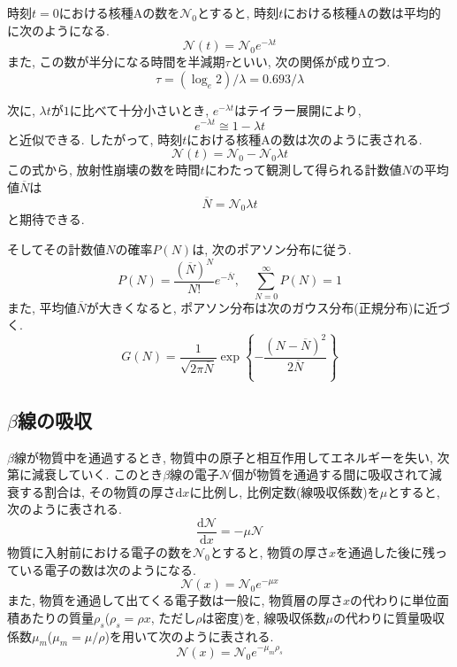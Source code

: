 \documentclass{jarticle}
\begin{document}
時刻$t=0$における核種$\mathrm{A}$の数を$\mathcal{N}_0$とすると, 時刻$t$における核種$\mathrm{A}$の数は平均的に次のようになる.
\begin{equation}
  \mathcal{N}(t) = \mathcal{N}_0 e^{-\lambda t}
\end{equation}
また, この数が半分になる時間を半減期$\tau$といい, 次の関係が成り立つ.
\begin{equation}
  \tau = (\log_e 2)/\lambda
  = 0.693/\lambda
\end{equation}

次に, $\lambda t$が$1$に比べて十分小さいとき, $e^{-\lambda t}$はテイラー展開により,
\begin{equation}
  e^{-\lambda t} \cong 1 - \lambda t
\end{equation}
と近似できる.
したがって, 時刻$t$における核種$\mathrm{A}$の数は次のように表される.
\begin{equation}
  \mathcal{N}(t)=\mathcal{N}_0-\mathcal{N}_0\lambda t
\end{equation}
この式から, 放射性崩壊の数を時間$t$にわたって観測して得られる計数値$N$の平均値$\overline{N}$は
\begin{equation}
  \overline{N} = \mathcal{N}_0\lambda t
\end{equation}
と期待できる.

そしてその計数値$N$の確率$P(N)$は, 次のポアソン分布に従う.
\begin{equation}
  P(N) = \frac{(\overline{N})^N}{N!}e^{-\overline{N}}, \quad
  \sum_{N=0}^{\infty} P(N) = 1
  \label{eq:poisson}
\end{equation}
また, 平均値$\overline{N}$が大きくなると, ポアソン分布は次のガウス分布(正規分布)に近づく.
\begin{equation}
  G(N) = \frac{1}{\sqrt{2\pi\overline{N}}} \exp \left\{-\frac{(N-\overline{N})^2}{2\overline{N}}\right\}
\end{equation}


\subsection{$\beta$線の吸収}

$\beta$線が物質中を通過するとき, 物質中の原子と相互作用してエネルギーを失い, 次第に減衰していく.
このとき$\beta$線の電子$\mathcal{N}$個が物質を通過する間に吸収されて減衰する割合は, その物質の厚さ$\mathrm{d}x$に比例し, 比例定数(線吸収係数)を$\mu$とすると, 次のように表される.
\begin{equation}
  \frac{\mathrm{d}\mathcal{N}}{\mathrm{d}x} = -\mu \mathcal{N}
\end{equation}
物質に入射前における電子の数を$\mathcal{N}_0$とすると, 物質の厚さ$x$を通過した後に残っている電子の数は次のようになる.
\begin{equation}
  \mathcal{N}(x) = \mathcal{N}_0 e^{-\mu x}
\end{equation}
また, 物質を通過して出てくる電子数は一般に, 物質層の厚さ$x$の代わりに単位面積あたりの質量$\rho_s$($\rho_s=\rho x$, ただし$\rho$は密度)を, 線吸収係数$\mu$の代わりに質量吸収係数$\mu_m$($\mu_m=\mu/\rho$)を用いて次のように表される.
\begin{equation}
  \mathcal{N}(x) = \mathcal{N}_0 e^{-\mu_m \rho_s}
\end{equation}
\end{document}
